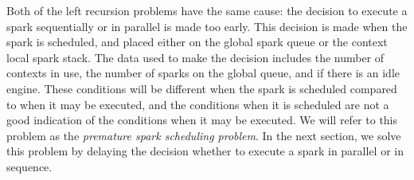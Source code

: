 Both of the left recursion problems have the same cause:
the decision to execute a spark sequentially or in parallel is
made too early.
This decision is made when the spark is scheduled,
and placed either on the global spark queue or the context local spark
stack.
The data used to make the decision includes the number of contexts in
use,
the number of sparks on the global queue,
and if there is an idle engine.
These conditions will be different when the spark is scheduled compared
to when it may be executed,
and the conditions when it is scheduled are not a good indication of
the conditions when it may be executed.
We will refer to this problem as the \emph{premature spark scheduling problem}.
In the next section,
we solve this problem by delaying the decision whether to execute a spark in
parallel or in sequence.

